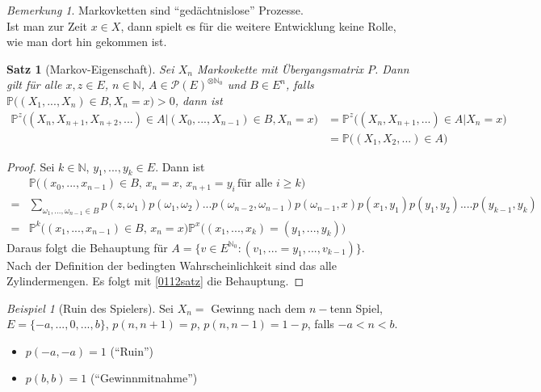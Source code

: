 \documentclass[10pt,a4paper]{article}
\newcommand{\N}{\ensuremath{\mathbb{N}}}
\newcommand{\Potset}{\mathscr P}
\newcommand{\Prb}{\mathbb P}
\theoremstyle{plain}
\newtheorem{satz}[theorem]{Satz}
\theoremstyle{definition}
\theoremstyle{remark}
\newtheorem*{bem*}{Bemerkung}
\newtheorem{exm}[theorem]{Beispiel}
\begin{document}
	\begin{bem*}
		Markovketten sind \enquote{gedächtnislose} Prozesse.\\
		Ist man zur Zeit $x\in X$, dann spielt es für die weitere Entwicklung keine Rolle, wie man dort hin gekommen ist.
	\end{bem*}

	\begin{satz}[Markov-Eigenschaft]\label{0708satzMarkov}
		Sei $X_n$ Markovkette mit Übergangsmatrix $P$. Dann gilt für alle $x,z\in E$, $n\in\N$, $A\in\Potset(E)^{\otimes\N_0}$ und $B\in E^n$, falls $\Prb\big((X_1,...,X_n)\in B,X_n=x\big)>0$, dann ist
		\begin{align*}
		\Prb^z\big((X_n,X_{n+1},X_{n+2},...)\in A\vert (X_0,...,X_{n-1})\in B,X_n=x\big)&=\Prb^z\big((X_n,X_{n+1},...)\in A\vert X_n=x\big)\\
		&=\Prb\big((X_1,X_2,...)\in A\big)
		\end{align*}
	\end{satz}
	\begin{proof}
		Sei $k\in\N$, $y_1,...,y_k\in E$. Dann ist \begin{align*}
		&\Prb\big((x_0,...,x_{n-1})\in B,\,x_n=x,\, x_{n+1}=y_i\, \text{für alle $i\geq k$}\big)\\
		=&\sum_{\omega_1,...,\omega_{n-1}\in B}p(z,\omega_1)p(\omega_1,\omega_2)...p(\omega_{n-2},\omega_{n-1})p(\omega_{n-1},x)p(x_1,y_1)p(y_1,y_2)....p(y_{k-1},y_k)\\
		=&\Prb^k\big((x_1,...,x_{n-1})\in B,\,x_n=x\big)\Prb^x\big((x_1,...,x_k)=(y_1,...,y_k)\big)
		\end{align*}
		Daraus folgt die Behauptung für $A=\{v\in E^{\N_0}:(v_1,...=y_1,...,v_{k-1})\}$.\\
		Nach der Definition der bedingten Wahrscheinlichkeit sind das alle Zylindermengen. Es folgt mit \ref{0112satz} die Behauptung.
	\end{proof}

	\begin{exm}[Ruin des Spielers]
		Sei $X_n=$ Gewinng nach dem $n-$tenn Spiel, $E=\{-a,...,0,...,b\}$, $p(n,n+1)=p$, $p(n,n-1)=1-p$, falls $-a<n<b$.
		\begin{itemize}
		\item $p(-a,-a)=1$ (\enquote{Ruin})
		\item $p(b,b)=1$ (\enquote{Gewinnmitnahme})
		\end{itemize}
	\end{exm}
\end{document}
